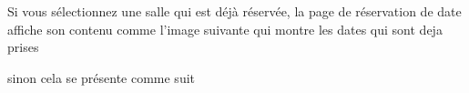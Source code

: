 \documentclass{article}
\begin{document}
\begin{enumerate}
  \vspace{0.7cm}
   
\hspace*{-0.7in}
               \noindent{}  
  
  
  Si vous sélectionnez une salle qui est déjà réservée, la page de réservation de date affiche son contenu comme l'image suivante qui montre les dates qui sont deja prises
  
  
  
  \vspace{0.7cm}
   
\hspace*{-0.7in}
               \noindent{}  
  
  sinon cela se présente comme suit
  
  
  

\end{enumerate}
\end{document}
